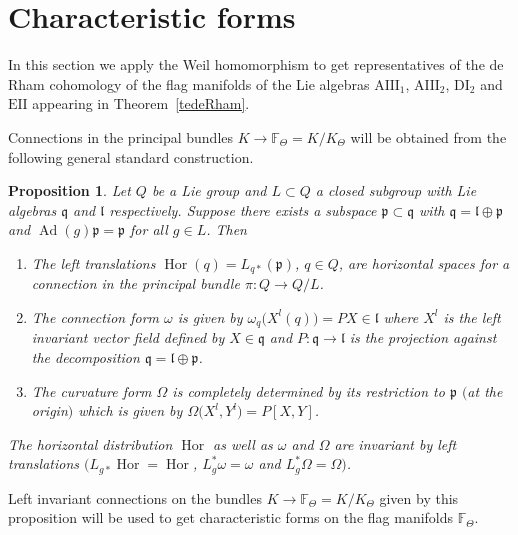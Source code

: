 \documentclass[10pt,a4paper]{amsart}
\numberwithin{equation}{section}
\newtheorem{Proposition}[Theorem]{Proposition}
 { \theoremstyle{definition}
\newtheorem{Definition}[Theorem]{Definition}
\newtheorem{Note}[Theorem]{Note}
\newtheorem{Example}[Theorem]{Example}
\newtheorem{Remark}[Theorem]{Remark} }
\begin{document}
\section{Characteristic forms}\label{secCharacClass}

In this section we apply the Weil homomorphism to get representatives of the de Rham cohomo\-lo\-gy of the flag manifolds of the Lie algebras $\mathrm{AIII}_{1}$, $\mathrm{AIII}_{2}$, $\mathrm{DI}_{2}$ and $\mathrm{EII}$ appearing in Theorem~\ref{tedeRham}.

Connections in the principal bundles $K\rightarrow \mathbb{F}_{\Theta}=K/K_{\Theta }$ will be obtained from the following general standard construction.

\begin{Proposition}Let $Q$ be a Lie group and $L\subset Q$ a closed subgroup with Lie algebras $\mathfrak{q}$ and $\mathfrak{l}$ respectively. Suppose there exists a subspace $\mathfrak{p}\subset \mathfrak{q}$ with $\mathfrak{q}=\mathfrak{l}\oplus \mathfrak{p}$ and $\operatorname{Ad}(g) \mathfrak{p}=\mathfrak{p}$ for all $g\in L$. Then
\begin{enumerate}\itemsep=0pt
\item[$1.$] The left translations $\operatorname{Hor}(q) =L_{q\ast } ( \mathfrak{p}) $, $q\in Q$, are horizontal spaces for a connection in the principal bundle $\pi\colon Q\rightarrow Q/L$.

\item[$2.$] The connection form $\omega $ is given by $\omega _{q}\big(X^{l}(q) \big) =PX\in \mathfrak{l}$ where $X^{l}$ is the left invariant vector field defined by $X\in \mathfrak{q}$ and $P\colon \mathfrak{q}\rightarrow \mathfrak{l}$ is the projection against the decomposition $\mathfrak{q}=\mathfrak{l}\oplus \mathfrak{p}$.

\item[$3.$] The curvature form $\Omega $ is completely determined by its restriction to $\mathfrak{p}$ $($at the origin$)$ which is given by $\Omega \big( X^{l},Y^{l}\big) =P [ X,Y ] $.
\end{enumerate}

The horizontal distribution $\operatorname{Hor}$ as well as $\omega $ and $\Omega $ are invariant by left translations $(L_{g\ast }\operatorname{Hor} \allowbreak=\operatorname{Hor}$, $L_{g}^{\ast }\omega =\omega $ and $L_{g}^{\ast }\Omega =\Omega )$.
\end{Proposition}

Left invariant connections on the bundles $K\rightarrow \mathbb{F}_{\Theta }=K/K_{\Theta }$ given by this proposition will be used to get characteristic forms on the flag manifolds $\mathbb{F}_{\Theta }$.
\end{document}
